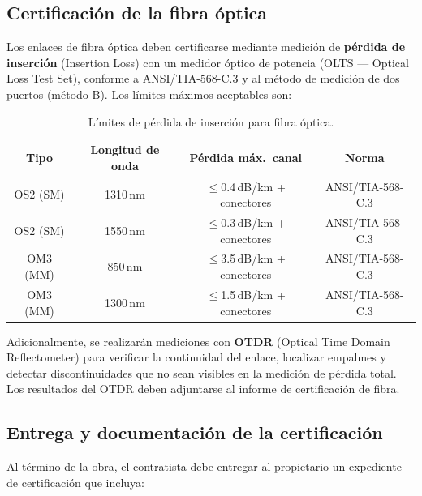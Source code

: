 \subsection{Certificación de la fibra óptica}

Los enlaces de fibra óptica deben certificarse mediante medición de
\textbf{pérdida de inserción} (Insertion Loss) con un medidor óptico de potencia
(OLTS — Optical Loss Test Set), conforme a \mbox{ANSI/TIA-568-C.3} y al método
de medición de dos puertos (método B). Los límites máximos aceptables son:

\begin{table}[H]
    \centering
    \caption{Límites de pérdida de inserción para fibra óptica.}
    \label{tab:certificacion_fo}
    \begin{tabular}{|c|c|c|c|}
        \hline
        \textbf{Tipo} & \textbf{Longitud de onda} &
        \textbf{Pérdida máx.\ canal} & \textbf{Norma} \\
        \hline
        OS2 (SM) & 1310\,nm & $\leq$0.4\,dB/km + conectores & ANSI/TIA-568-C.3 \\
        OS2 (SM) & 1550\,nm & $\leq$0.3\,dB/km + conectores & ANSI/TIA-568-C.3 \\
        OM3 (MM) & 850\,nm  & $\leq$3.5\,dB/km + conectores & ANSI/TIA-568-C.3 \\
        OM3 (MM) & 1300\,nm & $\leq$1.5\,dB/km + conectores & ANSI/TIA-568-C.3 \\
        \hline
    \end{tabular}
\end{table}

Adicionalmente, se realizarán mediciones con \textbf{OTDR} (Optical Time Domain
Reflectometer) para verificar la continuidad del enlace, localizar empalmes y
detectar discontinuidades que no sean visibles en la medición de pérdida total.
Los resultados del OTDR deben adjuntarse al informe de certificación de fibra.

\subsection{Entrega y documentación de la certificación}

Al término de la obra, el contratista debe entregar al propietario un expediente
de certificación que incluya:

